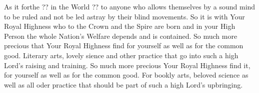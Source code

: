 \newpage


\newpage




As it forthe ?? in the World ?? to anyone who allows themselves by a
sound mind to be ruled and not be led astray by their blind
movements. So it is with Your Royal Highness who to the Crown and the
Spire are born and in your High Person the whole Nation's Welfare
depends and is contained. So much more precious that Your Royal
Highness find for yourself as well as for the common good. Literary
arts, lovely sience and other practice that go into such a high Lord's 
raising and training. So much more precious Your Royal Highness find
it,  for yourself as well as for the common good. For bookly arts,
beloved science as well as all oder practice that should be part of
such a high Lord's upbringing.
